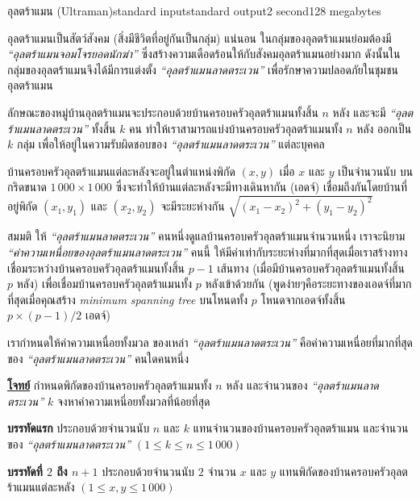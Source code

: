 \documentclass[11pt,a4paper]{article}
\begin{document}
\begin{problem}{อุลตร้าแมน (Ultraman)}{standard input}{standard output}{2 second}{128 megabytes}

 อุลตร้าแมนเป็นสัตว์สังคม (สิ่งมีชีวิตที่อยู่กันเป็นกลุ่ม) แน่นอน ในกลุ่มของอุลตร้าแมนย่อมต้องมี \textit{“อุลตร้าแมนจอมโจรยอดนักฆ่า”} ซึ่งสร้างความเดือดร้อนให้กับสังคมอุลตร้าแมนอย่างมาก ดังนั้นในกลุ่มของอุลตร้าแมนจึงได้มีการแต่งตั้ง \textit{“อุลตร้าแมนลาดตระเวน”} เพื่อรักษาความปลอดภัยในชุมชนอุลตร้าแมน

            ลักษณะของหมู่บ้านอุลตร้าแมนจะประกอบด้วยบ้านครอบครัวอุลตร้าแมนทั้งสิ้น $n$ หลัง และจะมี \textit{“อุลตร้าแมนลาดตระเวน”} ทั้งสิ้น $k$ คน ทำให้เราสามารถแบ่งบ้านครอบครัวอุลตร้าแมนทั้ง $n$ หลัง ออกเป็น $k$ กลุ่ม เพื่อให้อยู่ในความรับผิดชอบของ \textit{“อุลตร้าแมนลาดตระเวน”} แต่ละบุคคล

            บ้านครอบครัวอุลตร้าแมนแต่ละหลังจะอยู่ในตำแหน่งพิกัด $(x,y)$ เมื่อ $x$ และ $y$ เป็นจำนวนนับ บนกริดขนาด $1\,000 \times 1\,000$ ซึ่งจะทำให้บ้านแต่ละหลังจะมีทางเดินหากัน (เอดจ์) เชื่อมถึงกันโดยบ้านที่อยู่พิกัด $(x_1,y_1)$ และ $(x_2,y_2)$ จะมีระยะห่างกัน $\sqrt{(x_1-x_2)^2 + (y_1-y_2)^2 } $

            สมมติ ให้ \textit{“อุลตร้าแมนลาดตระเวน”} คนหนึ่งดูแลบ้านครอบครัวอุลตร้าแมนจำนวนหนึ่ง เราจะนิยาม \textit{“ค่าความเหนื่อยของอุลตร้าแมนลาดตระเวน”} คนนี้ ให้มีค่าเท่ากับระยะห่างที่มากที่สุดเมื่อเราสร้างทางเชื่อมระหว่างบ้านครอบครัวอุลตร้าแมนทั้งสิ้น $p-1$ เส้นทาง (เมื่อมีบ้านครอบครัวอุลตร้าแมนทั้งสิ้น $p$ หลัง) เพื่อเชื่อมบ้านครอบครัวอุลตร้าแมนทั้ง $p$ หลังเข้าด้วยกัน (พูดง่ายๆคือระยะทางของเอดจ์ที่มากที่สุดเมื่อคุณสร้าง\textit{ minimum spanning tree} บนโหนดทั้ง $p$ โหนดจากเอดจ์ทั้งสิ้น $p \times (p-1)/2$ เอดจ์)

            เรากำหนดให้ค่าความเหนื่อยทั้งมวล ของเหล่า \textit{“อุลตร้าแมนลาดตระเวน”} คือค่าความเหนื่อยที่มากที่สุดของ \textit{“อุลตร้าแมนลาดตระเวน”} คนใดคนหนึ่ง

          

\bigskip
\underline{\textbf{โจทย์}}    กำหนดพิกัดของบ้านครอบครัวอุลตร้าแมนทั้ง $n$ หลัง และจำนวนของ \textit{“อุลตร้าแมนลาดตระเวน”} $k$ จงหาค่าความเหนี่อยทั้งมวลที่น้อยที่สุด


\InputFile

\textbf{บรรทัดแรก} ประกอบด้วยจำนวนนับ $n$ และ $k$ แทนจำนวนของบ้านครอบครัวอุลตร้าแมน และจำนวนของ \textit{“อุลตร้าแมนลาดตระเวน”} $( 1 \leq k \leq n \leq 1\,000)$

\textbf{บรรทัดที่ $2$ ถึง $n+1$} ประกอบด้วยจำนวนนับ $2$ จำนวน $x$ และ $y$ แทนพิกัดของบ้านครอบครัวอุลตร้าแมนแต่ละหลัง $( 1 \leq x, y \leq 1\,000 )$



\end{problem}
\end{document}
